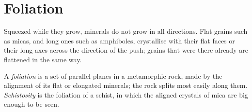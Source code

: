 \section{Foliation}\label{sec:g12:metamorphic-rocks:foliation}

Squeezed while they grow, minerals do not grow in all directions. Flat
grains such as micas, and long ones such as amphiboles, crystallise with
their flat faces or their long axes across the direction of the push; grains that were there already are flattened in the same
way.

\begin{definition}\label{def:g12:metamorphic-rocks:foliation}
A \emph{foliation} is a set of parallel planes in a
metamorphic rock, made by the alignment of its flat or elongated minerals;
the rock splits most easily along them. \emph{Schistosity}
is the foliation of a schist, in which the aligned crystals of mica are big
enough to be seen.
\end{definition}

